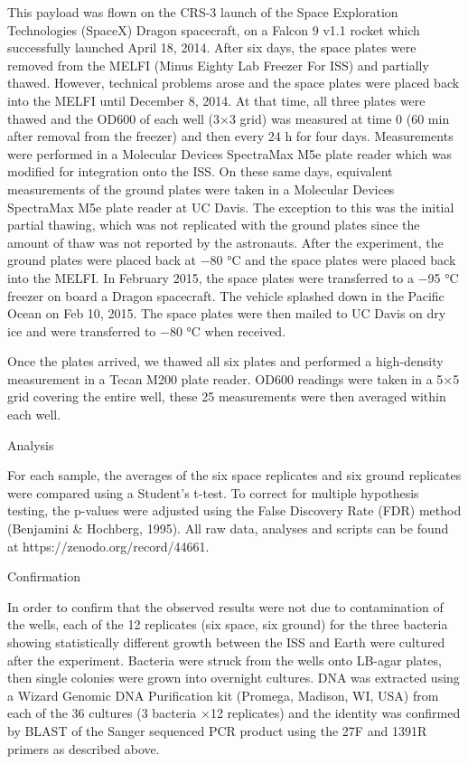 This payload was flown on the CRS-3 launch of the Space Exploration Technologies (SpaceX) Dragon spacecraft, on a Falcon 9 v1.1 rocket which successfully launched April 18, 2014. After six days, the space plates were removed from the MELFI (Minus Eighty Lab Freezer For ISS) and partially thawed. However, technical problems arose and the space plates were placed back into the MELFI until December 8, 2014. At that time, all three plates were thawed and the OD600 of each well (3×3 grid) was measured at time 0 (60 min after removal from the freezer) and then every 24 h for four days. Measurements were performed in a Molecular Devices SpectraMax M5e plate reader which was modified for integration onto the ISS. On these same days, equivalent measurements of the ground plates were taken in a Molecular Devices SpectraMax M5e plate reader at UC Davis. The exception to this was the initial partial thawing, which was not replicated with the ground plates since the amount of thaw was not reported by the astronauts. After the experiment, the ground plates were placed back at −80 °C and the space plates were placed back into the MELFI. In February 2015, the space plates were transferred to a −95 °C freezer on board a Dragon spacecraft. The vehicle splashed down in the Pacific Ocean on Feb 10, 2015. The space plates were then mailed to UC Davis on dry ice and were transferred to −80 °C when received.

Once the plates arrived, we thawed all six plates and performed a high-density measurement in a Tecan M200 plate reader. OD600 readings were taken in a 5×5 grid covering the entire well, these 25 measurements were then averaged within each well.

Analysis

For each sample, the averages of the six space replicates and six ground replicates were compared using a Student’s t-test. To correct for multiple hypothesis testing, the p-values were adjusted using the False Discovery Rate (FDR) method (Benjamini & Hochberg, 1995). All raw data, analyses and scripts can be found at https://zenodo.org/record/44661.

Confirmation

In order to confirm that the observed results were not due to contamination of the wells, each of the 12 replicates (six space, six ground) for the three bacteria showing statistically different growth between the ISS and Earth were cultured after the experiment. Bacteria were struck from the wells onto LB-agar plates, then single colonies were grown into overnight cultures. DNA was extracted using a Wizard Genomic DNA Purification kit (Promega, Madison, WI, USA) from each of the 36 cultures (3 bacteria ×12 replicates) and the identity was confirmed by BLAST of the Sanger sequenced PCR product using the 27F and 1391R primers as described above.

